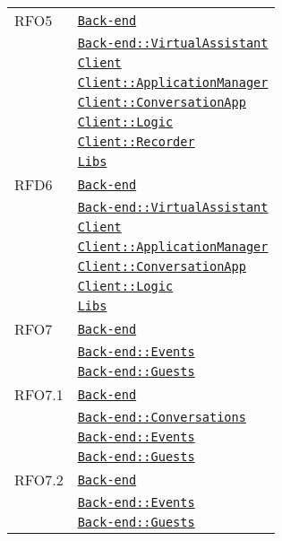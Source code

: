 \begin{longtable}{|>{\centering}m{3cm}|m{10cm}<{\centering}|}
RFO5 & \hyperref[Back-end]{\texttt{Back-end}}\\
& \hyperref[Back-end::VirtualAssistant]{\texttt{Back-end::VirtualAssistant}}\\
& \hyperref[Client]{\texttt{Client}}\\
& \hyperref[Client::ApplicationManager]{\texttt{Client::ApplicationManager}}\\
& \hyperref[Client::ConversationApp]{\texttt{Client::ConversationApp}}\\
& \hyperref[Client::Logic]{\texttt{Client::Logic}}\\
& \hyperref[Client::Recorder]{\texttt{Client::Recorder}}\\
& \hyperref[Libs]{\texttt{Libs}}\\ \hline

RFD6 & \hyperref[Back-end]{\texttt{Back-end}}\\
& \hyperref[Back-end::VirtualAssistant]{\texttt{Back-end::VirtualAssistant}}\\
& \hyperref[Client]{\texttt{Client}}\\
& \hyperref[Client::ApplicationManager]{\texttt{Client::ApplicationManager}}\\
& \hyperref[Client::ConversationApp]{\texttt{Client::ConversationApp}}\\
& \hyperref[Client::Logic]{\texttt{Client::Logic}}\\
& \hyperref[Libs]{\texttt{Libs}}\\ \hline

RFO7 & \hyperref[Back-end]{\texttt{Back-end}}\\
& \hyperref[Back-end::Events]{\texttt{Back-end::Events}}\\
& \hyperref[Back-end::Guests]{\texttt{Back-end::Guests}}\\ \hline

RFO7.1 & \hyperref[Back-end]{\texttt{Back-end}}\\
& \hyperref[Back-end::Conversations]{\texttt{Back-end::Conversations}}\\
& \hyperref[Back-end::Events]{\texttt{Back-end::Events}}\\
& \hyperref[Back-end::Guests]{\texttt{Back-end::Guests}}\\ \hline

RFO7.2 & \hyperref[Back-end]{\texttt{Back-end}}\\
& \hyperref[Back-end::Events]{\texttt{Back-end::Events}}\\
& \hyperref[Back-end::Guests]{\texttt{Back-end::Guests}}\\ \hline


\end{longtable}
